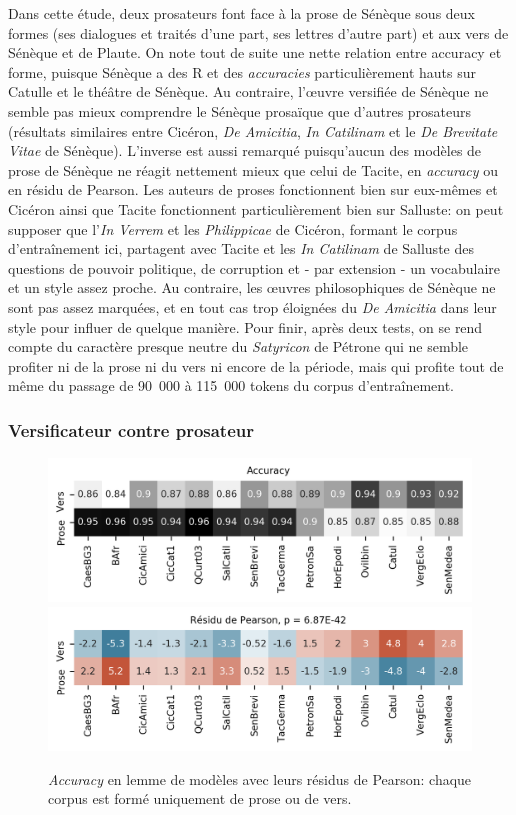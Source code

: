 Dans cette étude, deux prosateurs font face à la prose de Sénèque sous deux formes (ses dialogues et traités d'une part, ses lettres d'autre part) et aux vers de Sénèque et de Plaute. On note tout de suite une nette relation entre accuracy et forme, puisque Sénèque a des R et des \textit{accuracies} particulièrement hauts sur Catulle et le théâtre de Sénèque. Au contraire, l'œuvre versifiée de Sénèque ne semble pas mieux comprendre le Sénèque prosaïque que d'autres prosateurs (résultats similaires entre Cicéron, \textit{De Amicitia}, \textit{In Catilinam} et le \textit{De Brevitate Vitae} de Sénèque). L'inverse est aussi remarqué puisqu'aucun des modèles de prose de Sénèque ne réagit nettement mieux que celui de Tacite, en \textit{accuracy} ou en résidu de Pearson. Les auteurs de proses fonctionnent bien sur eux-mêmes et Cicéron ainsi que Tacite fonctionnent particulièrement bien sur Salluste: on peut supposer que l'\textit{In Verrem} et les \textit{Philippicae} de Cicéron, formant le corpus d'entraînement ici, partagent avec Tacite et les \textit{In Catilinam} de Salluste des questions de pouvoir politique, de corruption et - par extension - un vocabulaire et un style assez proche. Au contraire, les œuvres philosophiques de Sénèque ne sont pas assez marquées, et en tout cas trop éloignées du \textit{De Amicitia} dans leur style pour influer de quelque manière. Pour finir, après deux tests, on se rend compte du caractère presque neutre du \textit{Satyricon} de Pétrone qui ne semble profiter ni de la prose ni du vers ni encore de la période, mais qui profite tout de même du passage de 90~000 à 115~000 tokens du corpus d'entraînement.

\subsubsection{Versificateur contre prosateur}

\begin{figure}[ht]
    \centering
    \includegraphics[width=0.7\linewidth]{figures/chap3/longreeVariante/LongreeVariante-AccuracyModeDExpression-Lemme.png}
    \includegraphics[width=0.7\linewidth]{figures/chap3/longreeVariante/LongreeVariante-AssocPlotModeDExpression-Lemme.png}
    \caption{\textit{Accuracy} en lemme de modèles avec leurs résidus de Pearson: chaque corpus est formé uniquement de prose ou de vers.}
    \label{fig:lemmatisation:longree:proseVSvers}
\end{figure}

